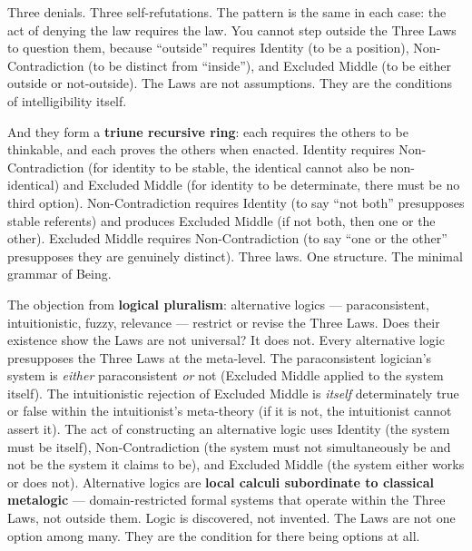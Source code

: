\documentclass[10pt, openany, oneside]{book}
\begin{document}
\vspace{0.8em}

\noindent Three denials. Three self-refutations. The pattern is the same in each case: the act of denying the law requires the law. You cannot step outside the Three Laws to question them, because ``outside'' requires Identity (to be a position), Non-Contradiction (to be distinct from ``inside''), and Excluded Middle (to be either outside or not-outside). The Laws are not assumptions. They are the conditions of intelligibility itself.

And they form a \textbf{triune recursive ring}: each requires the others to be thinkable, and each proves the others when enacted. Identity requires Non-Contradiction (for identity to be stable, the identical cannot also be non-identical) and Excluded Middle (for identity to be determinate, there must be no third option). Non-Contradiction requires Identity (to say ``not both'' presupposes stable referents) and produces Excluded Middle (if not both, then one or the other). Excluded Middle requires Non-Contradiction (to say ``one or the other'' presupposes they are genuinely distinct). Three laws. One structure. The minimal grammar of Being.

The objection from \textbf{logical pluralism}: alternative logics --- paraconsistent, intuitionistic, fuzzy, relevance --- restrict or revise the Three Laws. Does their existence show the Laws are not universal? It does not. Every alternative logic presupposes the Three Laws at the meta-level. The paraconsistent logician's system is \textit{either} paraconsistent \textit{or} not (Excluded Middle applied to the system itself). The intuitionistic rejection of Excluded Middle is \textit{itself} determinately true or false within the intuitionist's meta-theory (if it is not, the intuitionist cannot assert it). The act of constructing an alternative logic uses Identity (the system must be itself), Non-Contradiction (the system must not simultaneously be and not be the system it claims to be), and Excluded Middle (the system either works or does not). Alternative logics are \textbf{local calculi subordinate to classical metalogic} --- domain-restricted formal systems that operate within the Three Laws, not outside them. Logic is discovered, not invented. The Laws are not one option among many. They are the condition for there being options at all.

\vspace{1.5em}

\end{document}
